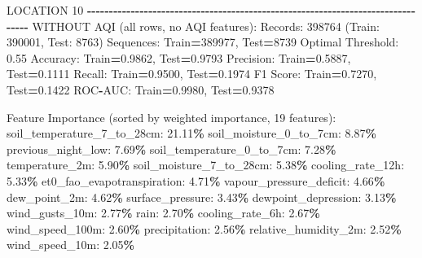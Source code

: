 \documentclass[
  letterpaper,
  DIV=11,
  numbers=noendperiod]{scrartcl}
\newenvironment{Shaded}{\begin{snugshade}}{\end{snugshade}}
\newcommand{\BuiltInTok}[1]{#1}
\newcommand{\DecValTok}[1]{\textcolor[rgb]{0.00,0.00,0.81}{#1}}
\newcommand{\FloatTok}[1]{\textcolor[rgb]{0.00,0.00,0.81}{#1}}
\newcommand{\NormalTok}[1]{#1}
\newcommand{\OperatorTok}[1]{\textcolor[rgb]{0.81,0.36,0.00}{\textbf{#1}}}
\begin{document}
\begin{Shaded}
\begin{Highlighting}[]
\NormalTok{LOCATION }\DecValTok{10}
\OperatorTok{{-}{-}{-}{-}{-}{-}{-}{-}{-}{-}{-}{-}{-}{-}{-}{-}{-}{-}{-}{-}{-}{-}{-}{-}{-}{-}{-}{-}{-}{-}{-}{-}{-}{-}{-}{-}{-}{-}{-}{-}{-}{-}{-}{-}{-}{-}{-}{-}{-}{-}{-}{-}{-}{-}{-}{-}{-}{-}{-}{-}{-}{-}{-}{-}{-}{-}{-}{-}{-}{-}{-}{-}{-}{-}{-}{-}{-}{-}{-}{-}}
\NormalTok{WITHOUT AQI (}\BuiltInTok{all}\NormalTok{ rows, no AQI features):}
\NormalTok{  Records: }\DecValTok{398764}\NormalTok{ (Train: }\DecValTok{390001}\NormalTok{, Test: }\DecValTok{8763}\NormalTok{)}
\NormalTok{  Sequences: Train}\OperatorTok{=}\DecValTok{389977}\NormalTok{, Test}\OperatorTok{=}\DecValTok{8739}
\NormalTok{  Optimal Threshold: }\FloatTok{0.55}
\NormalTok{  Accuracy: Train}\OperatorTok{=}\FloatTok{0.9862}\NormalTok{, Test}\OperatorTok{=}\FloatTok{0.9793}
\NormalTok{  Precision: Train}\OperatorTok{=}\FloatTok{0.5887}\NormalTok{, Test}\OperatorTok{=}\FloatTok{0.1111}
\NormalTok{  Recall: Train}\OperatorTok{=}\FloatTok{0.9500}\NormalTok{, Test}\OperatorTok{=}\FloatTok{0.1974}
\NormalTok{  F1 Score: Train}\OperatorTok{=}\FloatTok{0.7270}\NormalTok{, Test}\OperatorTok{=}\FloatTok{0.1422}
\NormalTok{  ROC}\OperatorTok{{-}}\NormalTok{AUC: Train}\OperatorTok{=}\FloatTok{0.9980}\NormalTok{, Test}\OperatorTok{=}\FloatTok{0.9378}

\NormalTok{  Feature Importance (}\BuiltInTok{sorted}\NormalTok{ by weighted importance, }\DecValTok{19}\NormalTok{ features):}
\NormalTok{    soil\_temperature\_7\_to\_28cm: }\FloatTok{21.11}\OperatorTok{\%}
\NormalTok{    soil\_moisture\_0\_to\_7cm: }\FloatTok{8.87}\OperatorTok{\%}
\NormalTok{    previous\_night\_low: }\FloatTok{7.69}\OperatorTok{\%}
\NormalTok{    soil\_temperature\_0\_to\_7cm: }\FloatTok{7.28}\OperatorTok{\%}
\NormalTok{    temperature\_2m: }\FloatTok{5.90}\OperatorTok{\%}
\NormalTok{    soil\_moisture\_7\_to\_28cm: }\FloatTok{5.38}\OperatorTok{\%}
\NormalTok{    cooling\_rate\_12h: }\FloatTok{5.33}\OperatorTok{\%}
\NormalTok{    et0\_fao\_evapotranspiration: }\FloatTok{4.71}\OperatorTok{\%}
\NormalTok{    vapour\_pressure\_deficit: }\FloatTok{4.66}\OperatorTok{\%}
\NormalTok{    dew\_point\_2m: }\FloatTok{4.62}\OperatorTok{\%}
\NormalTok{    surface\_pressure: }\FloatTok{3.43}\OperatorTok{\%}
\NormalTok{    dewpoint\_depression: }\FloatTok{3.13}\OperatorTok{\%}
\NormalTok{    wind\_gusts\_10m: }\FloatTok{2.77}\OperatorTok{\%}
\NormalTok{    rain: }\FloatTok{2.70}\OperatorTok{\%}
\NormalTok{    cooling\_rate\_6h: }\FloatTok{2.67}\OperatorTok{\%}
\NormalTok{    wind\_speed\_100m: }\FloatTok{2.60}\OperatorTok{\%}
\NormalTok{    precipitation: }\FloatTok{2.56}\OperatorTok{\%}
\NormalTok{    relative\_humidity\_2m: }\FloatTok{2.52}\OperatorTok{\%}
\NormalTok{    wind\_speed\_10m: }\FloatTok{2.05}\OperatorTok{\%}


\end{Highlighting}
\end{Shaded}
\end{document}
